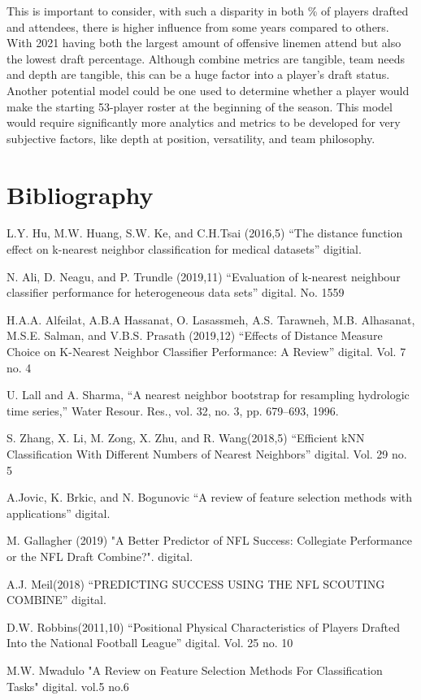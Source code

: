 \documentclass[confrence]{IEEEtran}
\begin{document}
This is important to consider, with such a disparity in both \% of players drafted and attendees, there is higher influence from some years compared to others.
With 2021 having both the largest amount of offensive linemen attend but also the lowest draft percentage.
Although combine metrics are tangible, team needs and depth are tangible, this can be a huge factor into a player’s draft status.
Another potential model could be one used to determine whether a player would make the starting 53-player roster at the beginning of the season.
This model would require significantly more analytics and metrics to be developed for very subjective factors, like depth at position, versatility, and team philosophy.
\section*{Bibliography}
L.Y. Hu, M.W. Huang, S.W. Ke, and C.H.Tsai (2016,5) “The distance function effect on k-nearest neighbor classification for medical datasets” digitial.

N. Ali, D. Neagu, and P. Trundle (2019,11) “Evaluation of k-nearest neighbour classifier performance for heterogeneous data sets” digital. No. 1559 

H.A.A. Alfeilat, A.B.A Hassanat, O. Lasassmeh, A.S. Tarawneh, M.B. Alhasanat, M.S.E. Salman, and V.B.S. Prasath (2019,12) “Effects of Distance Measure Choice on K-Nearest Neighbor Classifier Performance: A Review” digital. Vol. 7 no. 4 

U. Lall and A. Sharma, “A nearest neighbor bootstrap for resampling
hydrologic time series,” Water Resour. Res., vol. 32, no. 3, pp. 679–693,
1996.

S. Zhang, X. Li, M. Zong, X. Zhu, and R. Wang(2018,5) “Efficient kNN Classification With Different Numbers of Nearest Neighbors” digital. Vol. 29 no. 5

A.Jovic, K. Brkic, and N. Bogunovic “A review of feature selection methods with applications” digital.

M. Gallagher (2019) "A Better Predictor of NFL Success: Collegiate Performance or the NFL Draft Combine?". digital. 

A.J. Meil(2018) “PREDICTING SUCCESS USING THE NFL SCOUTING COMBINE” digital. 

D.W. Robbins(2011,10) “Positional Physical Characteristics of Players Drafted Into the National Football League” digital. Vol. 25 no. 10 

M.W. Mwadulo "A Review on Feature Selection Methods For Classification Tasks" digital. vol.5 no.6
  
\end{document}

